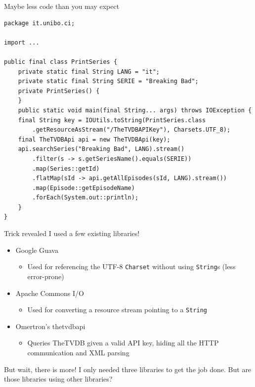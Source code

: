 \documentclass[presentation]{beamer}
\begin{document}
\begin{frame}[fragile]{Maybe less code than you may expect}
  \begin{block}{}
    \begin{verbatim}
package it.unibo.ci;

import ...

public final class PrintSeries {
    private static final String LANG = "it";
    private static final String SERIE = "Breaking Bad";
    private PrintSeries() {
    }
    public static void main(final String... args) throws IOException {
    final String key = IOUtils.toString(PrintSeries.class
        .getResourceAsStream("/TheTVDBAPIKey"), Charsets.UTF_8);
    final TheTVDBApi api = new TheTVDBApi(key);
    api.searchSeries("Breaking Bad", LANG).stream()
        .filter(s -> s.getSeriesName().equals(SERIE))
        .map(Series::getId)
        .flatMap(sId -> api.getAllEpisodes(sId, LANG).stream())
        .map(Episode::getEpisodeName)
        .forEach(System.out::println);
    }
}
    \end{verbatim}
  \end{block}
\end{frame}

\begin{frame}[fragile]{Trick revealed}
  I used a few existing libraries!
  \begin{itemize}
    \item Google Guava
    \begin{itemize}
      \item Used for referencing the UTF-8 \texttt{Charset} without using \texttt{String}s (less error-prone)
    \end{itemize}
    \item Apache Commons I/O
    \begin{itemize}
      \item Used for converting a resource stream pointing to a \texttt{String} 
    \end{itemize}
    \item Omertron's thetvdbapi
    \begin{itemize}
      \item Queries TheTVDB given a valid API key, hiding all the HTTP communication and XML parsing
    \end{itemize}
  \end{itemize}
  \begin{block}{But wait, there is more!}
    I only needed three libraries to get the job done. But are those libraries using other libraries?
  \end{block}
\end{frame}
\end{document}
